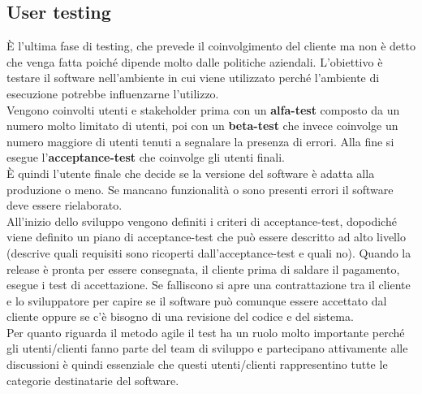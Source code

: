 \subsection{User testing}
È l'ultima fase di testing, che prevede il coinvolgimento del cliente ma non è detto che venga fatta poiché dipende molto dalle politiche aziendali.
L'obiettivo è testare il software nell'ambiente in cui viene utilizzato perché l'ambiente di esecuzione potrebbe influenzarne l'utilizzo.\\
Vengono coinvolti utenti e stakeholder prima con un \textbf{alfa-test} composto da un numero molto limitato di utenti, poi con un \textbf{beta-test} che invece coinvolge un numero maggiore di utenti tenuti a segnalare la presenza di errori.
Alla fine si esegue l'\textbf{acceptance-test} che coinvolge gli utenti finali.\\
È quindi l'utente finale che decide se la versione del software è adatta alla produzione o meno.
Se mancano funzionalità o sono presenti errori il software deve essere rielaborato.\\
All'inizio dello sviluppo vengono definiti i criteri di acceptance-test, dopodiché viene definito un piano di acceptance-test che può essere descritto ad alto livello (descrive quali requisiti sono ricoperti dall'acceptance-test e quali no).
Quando la release è pronta per essere consegnata, il cliente prima di saldare il pagamento, esegue i test di accettazione.
Se falliscono si apre una contrattazione tra il cliente e lo sviluppatore per capire se il software può comunque essere accettato dal cliente oppure se c'è bisogno di una revisione del codice e del sistema.\\
Per quanto riguarda il metodo agile il test ha un ruolo molto importante perché gli utenti/clienti fanno parte del team di sviluppo e partecipano attivamente alle discussioni è quindi essenziale che questi utenti/clienti rappresentino tutte le categorie destinatarie del software.

